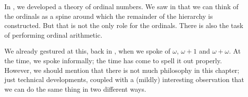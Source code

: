 \documentclass[../../../include/open-logic-section]{subfiles}
\begin{document}

In , we developed a theory of ordinal numbers.
We saw in  that we can think of the ordinals as a
spine around which the remainder of the hierarchy is constructed. But
that is not the only role for the ordinals. There is also the task of
performing ordinal arithmetic. 

We already gestured at this, back in
, when we spoke of $\omega$,
$\omega+1$ and $\omega+\omega$. At the time, we spoke informally; the
time has come to spell it out properly. However, we should mention
that there is not much philosophy in this chapter; just technical
developments, coupled with a (mildly) interesting observation that we
can do the same thing in two different ways.
\end{document}
